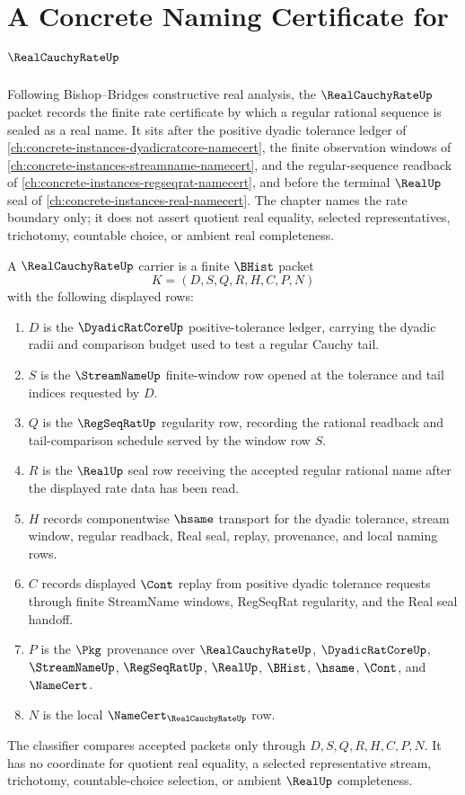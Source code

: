 \chapter{A Concrete Naming Certificate for $\RealCauchyRateUp$}
\label{ch:concrete-instances-real-cauchy-rate-namecert}

Following Bishop--Bridges constructive real analysis, the $\RealCauchyRateUp$ packet records the finite rate certificate by which a regular rational sequence is sealed as a real name. It sits after the positive dyadic tolerance ledger of \autoref{ch:concrete-instances-dyadicratcore-namecert}, the finite observation windows of \autoref{ch:concrete-instances-streamname-namecert}, and the regular-sequence readback of \autoref{ch:concrete-instances-regseqrat-namecert}, and before the terminal $\RealUp$ seal of \autoref{ch:concrete-instances-real-namecert}. The chapter names the rate boundary only; it does not assert quotient real equality, selected representatives, trichotomy, countable choice, or ambient real completeness.

\begin{definition}
\label{def:real-cauchy-rate-carrier}
A $\RealCauchyRateUp$ carrier is a finite $\BHist$ packet
$$
K=(D,S,Q,R,H,C,P,N)
$$
with the following displayed rows:
\begin{enumerate}
\item $D$ is the $\DyadicRatCoreUp$ positive-tolerance ledger, carrying the dyadic radii and comparison budget used to test a regular Cauchy tail.
\item $S$ is the $\StreamNameUp$ finite-window row opened at the tolerance and tail indices requested by $D$.
\item $Q$ is the $\RegSeqRatUp$ regularity row, recording the rational readback and tail-comparison schedule served by the window row $S$.
\item $R$ is the $\RealUp$ seal row receiving the accepted regular rational name after the displayed rate data has been read.
\item $H$ records componentwise $\hsame$ transport for the dyadic tolerance, stream window, regular readback, Real seal, replay, provenance, and local naming rows.
\item $C$ records displayed $\Cont$ replay from positive dyadic tolerance requests through finite StreamName windows, RegSeqRat regularity, and the Real seal handoff.
\item $P$ is the $\Pkg$ provenance over $\RealCauchyRateUp$, $\DyadicRatCoreUp$, $\StreamNameUp$, $\RegSeqRatUp$, $\RealUp$, $\BHist$, $\hsame$, $\Cont$, and $\NameCert$.
\item $N$ is the local $\NameCert_{\RealCauchyRateUp}$ row.
\end{enumerate}
The classifier compares accepted packets only through $D,S,Q,R,H,C,P,N$. It has no coordinate for quotient real equality, a selected representative stream, trichotomy, countable-choice selection, or ambient $\RealUp$ completeness.
\end{definition}

